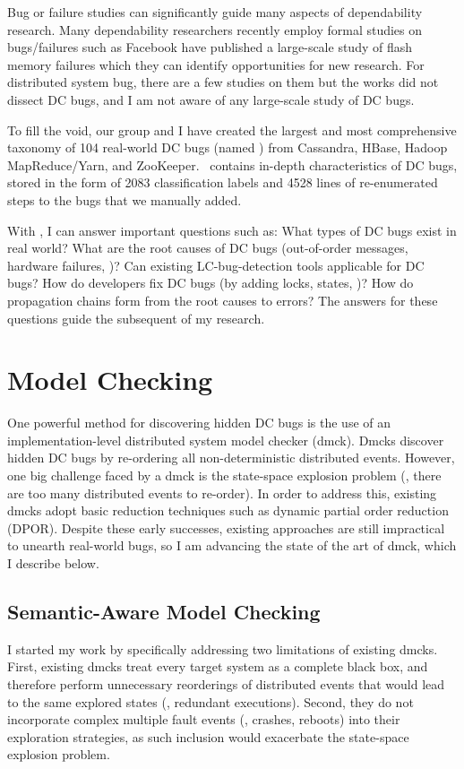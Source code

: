 \documentclass[11pt]{article}
\begin{document}
Bug or failure studies can significantly guide many aspects of dependability
research. Many dependability researchers recently employ formal studies on
bugs/failures such as Facebook have published a large-scale study of flash
memory failures which they can identify opportunities for new research. For
distributed system bug, there are a few studies on them but the works did not
dissect DC bugs, and I am not aware of any large-scale study of DC bugs. 

To fill the void, our group and I have created the largest and most
comprehensive taxonomy of 104 real-world DC bugs (named \taxdc) from Cassandra,
HBase, Hadoop MapReduce/Yarn, and ZooKeeper. \taxdc\ contains in-depth
characteristics of DC bugs, stored in the form of 2083 classification labels
and 4528 lines of re-enumerated steps to the bugs that we manually added. 

With \taxdc, I can answer important questions such as: What types of DC bugs
exist in real world? What are the root causes of DC bugs (out-of-order
messages, hardware failures, \etc)? Can existing LC-bug-detection tools
applicable for DC bugs? How do developers fix DC bugs (by adding locks, states,
\etc)? How do propagation chains form from the root causes to errors? The
answers for these questions guide the subsequent of my research.

\section{Model Checking}

One powerful method for discovering hidden DC bugs is the use of an
implementation-level distributed system model checker (dmck). Dmcks discover
hidden DC bugs by re-ordering all non-deterministic distributed events.
However, one big challenge faced by a dmck is the state-space explosion problem
(\ie, there are too many distributed events to re-order). In order to address
this, existing dmcks adopt basic reduction techniques such as dynamic partial
order reduction (DPOR). Despite these early successes, existing approaches are
still impractical to unearth real-world bugs, so I am advancing the state of the
art of dmck, which I describe below.

\subsection{Semantic-Aware Model Checking} 

I started my work by specifically addressing two limitations of existing dmcks.
First, existing dmcks treat every target system as a complete black box, and
therefore perform unnecessary reorderings of distributed events that would lead
to the same explored states (\ie, redundant executions). Second, they do not
incorporate complex multiple fault events (\eg, crashes, reboots) into their
exploration strategies, as such inclusion would exacerbate the state-space
explosion problem.
\end{document}
